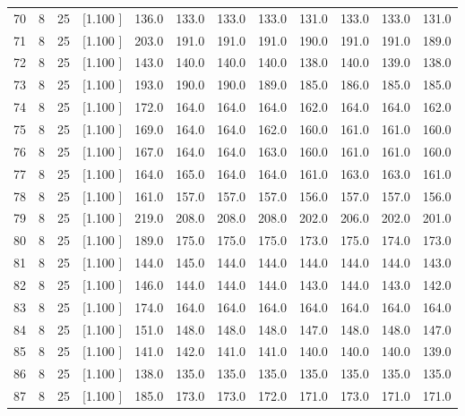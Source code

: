 \documentclass[12pt,a4paper]{article}
\begin{document}
\begin{center}
{\begin{tabular}{r r r r r r r r r r r r}
  70&  8& 25&[1.100     ]&   136.0&   133.0&   133.0&   133.0&   131.0&   133.0&   133.0&   131.0\\[-0.02in]
  71&  8& 25&[1.100     ]&   203.0&   191.0&   191.0&   191.0&   190.0&   191.0&   191.0&   189.0\\[-0.02in]
  72&  8& 25&[1.100     ]&   143.0&   140.0&   140.0&   140.0&   138.0&   140.0&   139.0&   138.0\\[-0.02in]
  73&  8& 25&[1.100     ]&   193.0&   190.0&   190.0&   189.0&   185.0&   186.0&   185.0&   185.0\\[-0.02in]
  74&  8& 25&[1.100     ]&   172.0&   164.0&   164.0&   164.0&   162.0&   164.0&   164.0&   162.0\\[-0.02in]
  75&  8& 25&[1.100     ]&   169.0&   164.0&   164.0&   162.0&   160.0&   161.0&   161.0&   160.0\\[-0.02in]
  76&  8& 25&[1.100     ]&   167.0&   164.0&   164.0&   163.0&   160.0&   161.0&   161.0&   160.0\\[-0.02in]
  77&  8& 25&[1.100     ]&   164.0&   165.0&   164.0&   164.0&   161.0&   163.0&   163.0&   161.0\\[-0.02in]
  78&  8& 25&[1.100     ]&   161.0&   157.0&   157.0&   157.0&   156.0&   157.0&   157.0&   156.0\\[-0.02in]
  79&  8& 25&[1.100     ]&   219.0&   208.0&   208.0&   208.0&   202.0&   206.0&   202.0&   201.0\\[-0.02in]
  80&  8& 25&[1.100     ]&   189.0&   175.0&   175.0&   175.0&   173.0&   175.0&   174.0&   173.0\\[-0.02in]
  81&  8& 25&[1.100     ]&   144.0&   145.0&   144.0&   144.0&   144.0&   144.0&   144.0&   143.0\\[-0.02in]
  82&  8& 25&[1.100     ]&   146.0&   144.0&   144.0&   144.0&   143.0&   144.0&   143.0&   142.0\\[-0.02in]
  83&  8& 25&[1.100     ]&   174.0&   164.0&   164.0&   164.0&   164.0&   164.0&   164.0&   164.0\\[-0.02in]
  84&  8& 25&[1.100     ]&   151.0&   148.0&   148.0&   148.0&   147.0&   148.0&   148.0&   147.0\\[-0.02in]
  85&  8& 25&[1.100     ]&   141.0&   142.0&   141.0&   141.0&   140.0&   140.0&   140.0&   139.0\\[-0.02in]
  86&  8& 25&[1.100     ]&   138.0&   135.0&   135.0&   135.0&   135.0&   135.0&   135.0&   135.0\\[-0.02in]
  87&  8& 25&[1.100     ]&   185.0&   173.0&   173.0&   172.0&   171.0&   173.0&   171.0&   171.0\\[-0.02in]

\end{tabular}}
\end{center}
\end{document}
